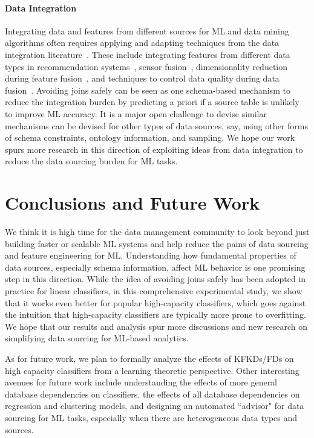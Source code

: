 \documentclass{vldb}
\begin{document}
\paragraph*{Data Integration}
Integrating data and features from different sources for ML and data mining algorithms often requires applying and adapting techniques from
the data integration literature~\cite{diforml,dibook}. These include integrating features from different data types in recommendation 
systems~\cite{multitypefusion}, sensor fusion~\cite{sensorfusion}, dimensionality reduction during feature fusion~\cite{dimredfusion},
and techniques to control data quality during data fusion~\cite{lunabdi}.
Avoiding joins safely can be seen as one schema-based mechanism to reduce the integration burden by predicting a priori if a source table is unlikely 
to improve ML accuracy. It is a major open challenge to devise similar mechanisms can be devised for other types of data sources, say, using other 
forms of schema constraints, ontology information, and sampling. We hope our work spurs more research in this direction of exploiting ideas from data integration 
to reduce the data sourcing burden for ML tasks.




\section{Conclusions and Future Work}
We think it is high time for the data management community to look beyond just building faster 
or scalable ML systems and help reduce the pains of data sourcing and feature engineering for ML. 
Understanding how fundamental properties of data sources, especially schema information, affect 
ML behavior is one promising step in this direction. 
While the idea of avoiding joins safely has been adopted  in practice for 
linear classifiers, in this comprehensive experimental study, we show that it works even better for 
popular high-capacity classifiers, which goes against the intuition that high-capacity classifiers 
are typically more prone to overfitting. We hope that our results and analysis spur more discussions 
and new research on simplifying data sourcing for ML-based analytics.

As for future work, we plan to formally analyze the effects of KFKDs/FDs on high capacity classifiers 
from a learning theoretic perspective. Other interesting avenues for future work include understanding 
the effects of more general database dependencies on classifiers, the effects of all database dependencies 
on regression and clustering models, and designing an automated ``advisor" for data sourcing for ML 
tasks, especially when there are heterogeneous data types and sources.

\pagebreak



\end{document}
